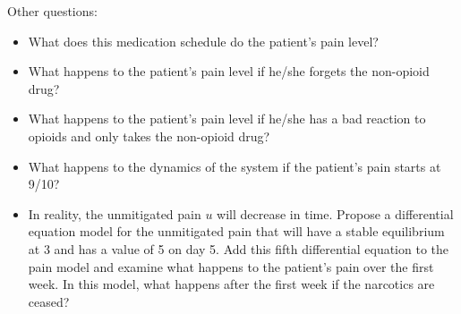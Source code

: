 \noindent Other questions:
\begin{itemize}
    \item What does this medication schedule do the patient's pain level?
    \item What happens to the patient's pain level if he/she forgets the non-opioid
        drug?
    \item What happens to the patient's pain level if he/she has a bad reaction to
        opioids and only takes the non-opioid drug?
    \item What happens to the dynamics of the system if the patient's pain starts at
        9/10?
    \item In reality, the unmitigated pain $u$ will decrease in time.  Propose a
        differential equation model for the unmitigated pain that will have a stable
        equilibrium at 3 and has a value of 5 on day 5. Add this fifth differential
        equation to the pain model and examine what happens to the patient's pain
        over the first week. In this model, what happens after the first week if the
        narcotics are ceased?
\end{itemize}


